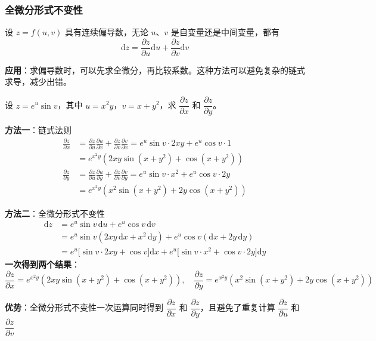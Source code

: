 \documentclass[../book.tex]{subfiles}
\begin{document}

    \subsubsection{全微分形式不变性}

    设 $z = f(u,v)$ 具有连续偏导数，无论 $u$、$v$ 是自变量还是中间变量，都有
    \[
        \mathrm{d}z = \frac{\partial z}{\partial u}\mathrm{d}u + \frac{\partial z}{\partial v}\mathrm{d}v
    \]

    \textbf{应用}：求偏导数时，可以先求全微分，再比较系数。这种方法可以避免复杂的链式求导，减少出错。

    \begin{analysisbox}[Example]
        设 $z = e^{u}\sin v$，其中 $u = x^2 y$，$v = x + y^2$，求 $\dfrac{\partial z}{\partial x}$ 和 $\dfrac{\partial z}{\partial y}$。

        \textbf{方法一}：链式法则
        \begin{align*}
            \frac{\partial z}{\partial x} &= \frac{\partial z}{\partial u}\frac{\partial u}{\partial x} + \frac{\partial z}{\partial v}\frac{\partial v}{\partial x} = e^{u}\sin v \cdot 2xy + e^{u}\cos v \cdot 1 \\
            &= e^{x^2 y}(2xy\sin(x+y^2) + \cos(x+y^2))\\[1em]
            \frac{\partial z}{\partial y} &= \frac{\partial z}{\partial u}\frac{\partial u}{\partial y} + \frac{\partial z}{\partial v}\frac{\partial v}{\partial y} = e^{u}\sin v \cdot x^2 + e^{u}\cos v \cdot 2y \\
            &= e^{x^2 y}(x^2\sin(x+y^2) + 2y\cos(x+y^2))
        \end{align*}

        \textbf{方法二}：全微分形式不变性
        \begin{align*}
            \mathrm{d}z &= e^{u}\sin v\,\mathrm{d}u + e^{u}\cos v\,\mathrm{d}v \\
            &= e^{u}\sin v(2xy\,\mathrm{d}x + x^2\,\mathrm{d}y) + e^{u}\cos v(\mathrm{d}x + 2y\,\mathrm{d}y) \\
            &= e^{u}\big[\sin v \cdot 2xy + \cos v\big]\mathrm{d}x + e^{u}\big[\sin v \cdot x^2 + \cos v \cdot 2y\big]\mathrm{d}y
        \end{align*}
        \textbf{一次得到两个结果}：
        \[
            \frac{\partial z}{\partial x} = e^{x^2 y}(2xy\sin(x+y^2) + \cos(x+y^2)), \quad \frac{\partial z}{\partial y} = e^{x^2 y}(x^2\sin(x+y^2) + 2y\cos(x+y^2))
        \]

        \textbf{优势}：全微分形式不变性一次运算同时得到 $\dfrac{\partial z}{\partial x}$ 和 $\dfrac{\partial z}{\partial y}$，且避免了重复计算 $\dfrac{\partial z}{\partial u}$ 和 $\dfrac{\partial z}{\partial v}$
    \end{analysisbox}
\end{document}
